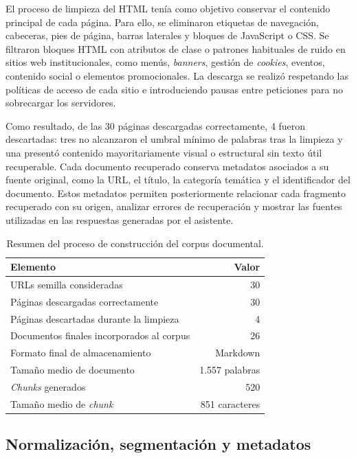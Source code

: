 El proceso de limpieza del HTML tenía como objetivo conservar el contenido principal de cada página. Para ello, se eliminaron etiquetas de navegación, cabeceras, pies de página, barras laterales y bloques de JavaScript o CSS. 
Se filtraron bloques HTML con atributos de clase o patrones habituales de ruido en sitios web institucionales, como menús, \textit{banners}, gestión de \textit{cookies}, eventos, contenido social o elementos promocionales. 
La descarga se realizó respetando las políticas de acceso de cada sitio e introduciendo pausas entre peticiones para no sobrecargar los servidores.

Como resultado, de las 30 páginas descargadas correctamente, 4 fueron descartadas: tres no alcanzaron el umbral mínimo de palabras tras la limpieza y una presentó contenido mayoritariamente visual o estructural sin texto útil recuperable. 
Cada documento recuperado conserva metadatos asociados a su fuente original, como la URL, el título, la categoría temática y el identificador del documento. 
Estos metadatos permiten posteriormente relacionar cada fragmento recuperado con su origen, analizar errores de recuperación y mostrar las fuentes utilizadas en las respuestas generadas por el asistente.

\begin{table}[H]
\centering
\begin{tabular}{lr}
\toprule
\textbf{Elemento} & \textbf{Valor} \\
\midrule
URLs semilla consideradas & 30 \\
Páginas descargadas correctamente & 30 \\
Páginas descartadas durante la limpieza & 4 \\
Documentos finales incorporados al corpus & 26 \\
\midrule
Formato final de almacenamiento & Markdown \\
Tamaño medio de documento & 1.557 palabras \\
\textit{Chunks} generados & 520 \\
Tamaño medio de \textit{chunk} & 851 caracteres \\
\bottomrule
\end{tabular}
\caption{Resumen del proceso de construcción del corpus documental.}
\label{tab:resumen_corpus}
\end{table}

\subsection{Normalización, segmentación y metadatos}\label{subsec:chunking-metadatos}


